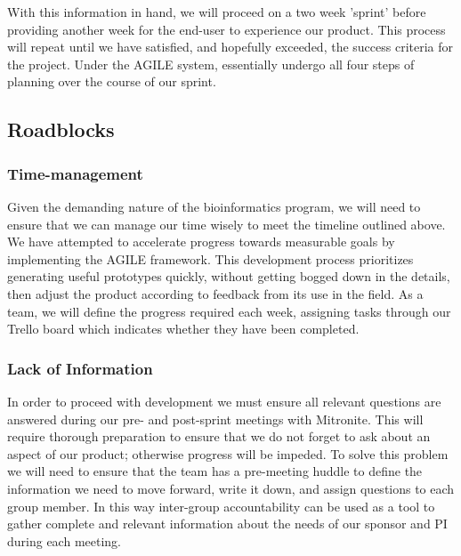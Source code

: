 \documentclass[10pt,twocolumn,letterpaper]{article}
\begin{document}
            With this information in hand, we will proceed on a two week 'sprint' before providing another week for the end-user to experience our product. This process will repeat until
 	    we have satisfied, and hopefully exceeded, the success criteria for the project. Under the AGILE system, essentially undergo all four steps of planning over the course of our
 	    sprint.

            \subsection{Roadblocks}


            \subsubsection{Time-management}
                    Given the demanding nature of the bioinformatics program, we will need to ensure that we can manage our time wisely to meet the timeline outlined above. We have 
		    attempted to accelerate progress towards measurable goals by implementing the AGILE framework. 
		    This development process prioritizes generating useful prototypes quickly, without getting bogged down in the details, then adjust the product according to feedback 
    		    from its use in the field. 
		    As a team, we will define the progress required each week, assigning tasks through our Trello board which indicates whether they have been completed.

            \subsubsection{Lack of Information}
                    In order to proceed with development we must ensure all relevant questions are answered during our pre- and post-sprint meetings with Mitronite. This will require thorough preparation to ensure that we do not forget to ask about an aspect of our product; otherwise progress will be impeded. To solve this problem we will need to ensure that the team has a pre-meeting huddle to define the information we need to move forward, write it down, and assign questions to each group member. In this way inter-group accountability can be used as a tool to gather complete and relevant information about the needs of our sponsor and PI during each meeting.
\end{document}
